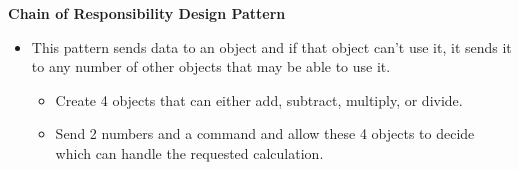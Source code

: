 \documentclass[10pt , a4paper]{article}
\newcommand{\Topic}{Chain of Responsibility Design Pattern}
\begin{document}
\huge{\textbf{\Topic}}
\large
\\[7pt]
\begin{itemize}
   \item This pattern sends data to an object and if that object can't use it, it sends it to any number of other objects that may be able to use it.  \\[3pt]
	\begin{itemize}
		 \item Create 4 objects that can either add, subtract, multiply, or divide. \\[3pt]
		 \item Send 2 numbers and a command and allow these 4 objects to decide which can handle the requested calculation. \\[3pt]
	\end{itemize}

\end{itemize}


\newpage

\end{document}
